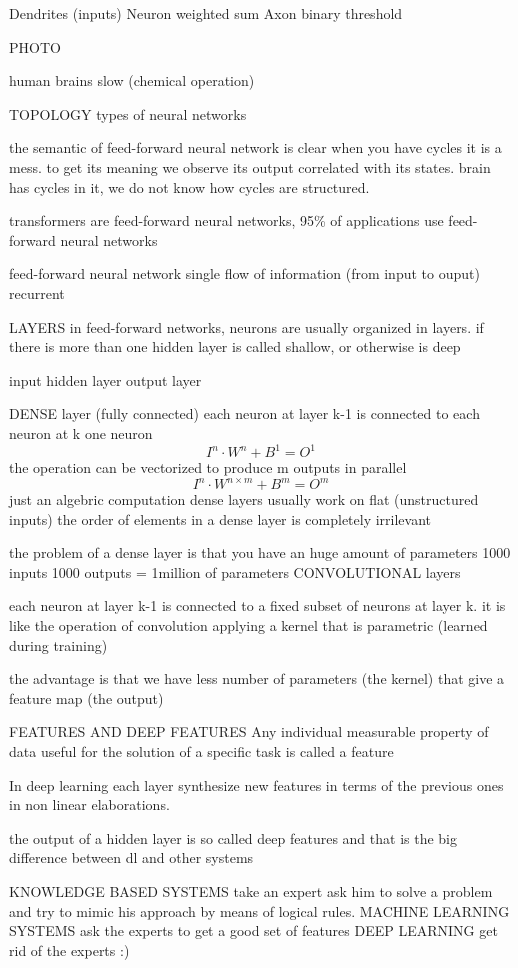 \documentclass{article}
\begin{document}
Dendrites (inputs)
Neuron weighted sum 
Axon binary threshold

PHOTO

human brains 
slow (chemical operation)

TOPOLOGY
types of neural networks


the semantic of feed-forward neural network is clear when you have cycles it
is a mess. to get its meaning we observe its output correlated with its
states.
brain has cycles in it, we do not know how cycles are structured.

transformers are feed-forward neural networks, 95\% of applications  use
feed-forward neural networks

feed-forward neural network single flow of information (from input to ouput)
recurrent

LAYERS 
in feed-forward networks, neurons are usually organized in layers. 
if there is more than one hidden layer is called shallow, or otherwise is deep

input 
hidden layer 
output layer 

DENSE layer (fully connected)
 each neuron at layer k-1 is connected to each neuron at k 
 one neuron 
 $$I^n\cdot W^n+B^1=O^1$$
 the operation can be vectorized to produce m outputs in parallel
 $$I^n\cdot W^{n\times m}+B^{m}=O^m$$
 just an algebric computation
 dense layers usually work on flat (unstructured inputs)
 the order of elements in a dense layer is completely irrilevant

 the problem of a dense layer is that you have an huge amount of parameters 
 1000 inputs 1000 outputs = 1million of parameters
CONVOLUTIONAL layers

each neuron at layer k-1 is connected to a fixed subset of neurons at layer k.
it is like the operation of convolution applying a kernel that is parametric
(learned during training)

the advantage is that we have less number of parameters (the kernel) that give
a feature map (the output)

FEATURES AND DEEP FEATURES 
Any individual measurable property of data useful for the solution of a
specific task is called a feature

In deep learning each layer synthesize new features in terms of the previous
ones in non linear elaborations.

the output of a hidden layer is so called deep features 
and that is the big difference between dl and other systems

KNOWLEDGE BASED SYSTEMS take an expert ask him to solve a problem and try to
mimic his approach by means of logical rules.
MACHINE LEARNING SYSTEMS ask the experts to get a good set of features
DEEP LEARNING get rid of the experts :)
\end{document}

